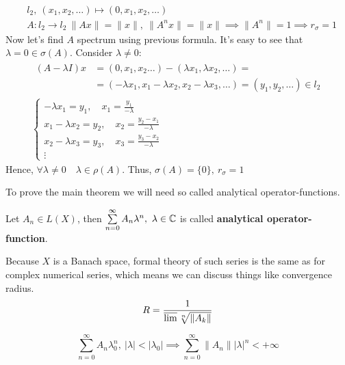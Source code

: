 \begin{note}
  \begin{align*}
    &l_2,\ (x_1, x_2, \dots) \mapsto (0, x_1, x_2, \dots) \\
    &A \colon l_2 \to l_2\ \|Ax\| = \|x\|,\ \|A^n x\| = \|x\| \implies \|A^n\| = 1 \implies r_\sigma = 1
  \end{align*}
  Now let's find $A$ spectrum using previous formula. It's easy to see that
  $\lambda = 0 \in \sigma(A)$. Consider $\lambda \neq 0$:
  \begin{gather*}
    \begin{split}
      (A - \lambda I) x& = (0, x_1, x_2 \dots) - (\lambda x_1, \lambda x_2, \dots) =\\
    &= (-\lambda x_1, x_1 - \lambda x_2, x_2 - \lambda x_3, \dots) = (y_1, y_2, \dots) \in l_2
    \end{split}\\
     \begin{cases}
      -\lambda x_1 = y_1,\quad x_1 = \frac{y_1}{-\lambda}\\
      x_1 - \lambda x_2 = y_2,\quad x_2 = \frac{y_2 - x_1}{-\lambda}\\
      x_2 - \lambda x_3 = y_3,\quad x_3 = \frac{y_3 - x_2}{-\lambda}\\
      \vdots
      \end{cases}
  \end{gather*}
    Hence, $\forall \lambda \neq 0 \quad \lambda \in \rho(A)$. Thus,
    $\sigma(A) = \{0\},\ r_\sigma = 1$
\end{note}

To prove the main theorem we will need so called analytical operator-functions.
\begin{defn}
  Let $A_n \in L(X)$, then 
   $\sum\limits_{n = 0}^\infty A_n \lambda^n,\ \lambda \in \mathbb{C}$ is called
   \textbf{analytical operator-function}.
\end{defn}

\begin{note}
  Because $X$ is a Banach space, formal theory of such series is the same as for
  complex numerical series, which means we can discuss things like convergence radius.
  \[
    R = \frac{1}{\varlimsup \sqrt[n]{\|A_k\|}}
  \]
\end{note}

\begin{lemma}[Abel]
  \[
    \sum_{n = 0}^\infty A_n \lambda_0^n,\ |\lambda| < |\lambda_0| \implies
    \sum_{n = 0}^\infty \|A_n\| |\lambda|^n < +\infty
  \]
\end{lemma}

